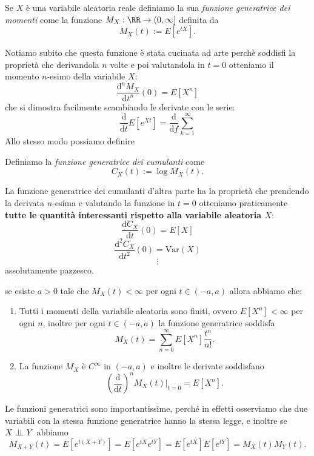 \documentclass[11pt]{scrartcl}
\newcommand{\dif}{\text{d}}
\begin{document}
	\begin{definition}
		Se $X$ è una variabile aleatoria reale definiamo la sua \textit{funzione generatrice dei momenti} come la funzione $M_X:\RR\to (0,\infty]$ definita da
		$$M_X(t):=E\left[e^{tX}\right].$$
	\end{definition}
	Notiamo subito che questa funzione è stata cucinata ad arte perchè soddisfi la proprietà che derivandola $n$ volte e poi valutandola in $t=0$ otteniamo il momento $n$-esimo della variabile $X$:
	$$\frac{\dif^n M_X}{\dif t^n}(0)=E\left[X^n\right]$$
	che si dimostra facilmente scambiando le derivate con le serie:
	$$\frac{\dif}{\dif t}E\left[e^{Xt}\right]=\frac{\dif}{\dif f}\sum_{k=1}^{\infty}$$
	Allo stesso modo possiamo definire
	\begin{definition}
		Definiamo la \textit{funzione generatrice dei cumulanti} come
		$$C_X(t):=\log M_X(t).$$
	\end{definition}
	La funzione generatrice dei cumulanti d'altra parte ha la proprietà che prendendo la derivata $n$-esima e valutando la funzione in $t=0$ otteniamo praticamente \textbf{tutte le quantità interessanti rispetto alla variabile aleatoria $X$}:
	$$\frac{\dif C_X}{\dif t}(0)=E\left[X\right]$$
	$$\frac{\dif^2 C_X}{\dif t^2}(0)=\text{Var}(X)$$
	$$\vdots$$
	assolutamente pazzesco.
	\begin{theorem}
		se esiste $a>0$ tale che $M_X(t)<\infty$ per ogni $t\in (-a,a)$ allora abbiamo che:
		\begin{enumerate}
			\item Tutti i momenti della variabile aleatoria sono finiti, ovvero $E[X^n]<\infty$ per ogni $n$, inoltre per ogni $t\in (-a,a)$ la funzione generatrice soddisfa
			$$M_X(t)=\sum_{n=0}^{\infty}E\left[X^n\right]\frac{t^n}{n!}.$$
			\item La funzione $M_X$ è $C^\infty$ in $(-a,a)$ e inoltre le derivate soddisfano
			$$\left(\frac{\dif}{\dif t}\right)^nM_X(t)\Bigg|_{t=0}=E\left[X^n\right].$$
		\end{enumerate} 
	\end{theorem}
	\begin{remark}
		Le funzioni generatrici sono importantissime, perché in effetti osserviamo che due variabili con la stessa funzione generatrice hanno la stessa legge, e inoltre se $X\indep Y$ abbiamo
		$$M_{X+Y}(t)=E\left[e^{t(X+Y)}\right]=E\left[e^{tX}e^{tY}\right]=E\left[e^{tX}\right]E\left[e^{tY}\right]=M_{X}(t)M_Y(t).$$
	\end{remark}
\end{document}
